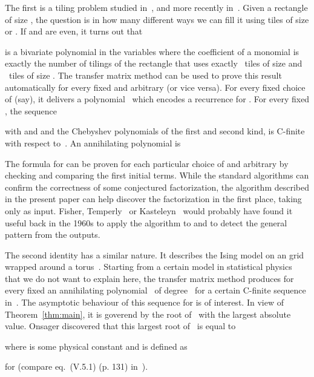 \documentclass{sig-alternate}
\begin{document}
\def\-{{\tikz[x=1.5pt,y=1.5pt]\draw[very thin](0,0) rectangle (1,1) (1,0) rectangle (2,1);}}
\def\|{{\tikz[x=1.5pt,y=1.5pt]\draw[very thin](0,0) rectangle (1,1) (0,1) rectangle (1,2);}}

The first is a tiling problem studied in~\cite{kasteleyn61,fisher61}, and more recently in~\cite{zeilberger06a}.
Given a rectangle of size , the question is
in how many different ways we can fill it using tiles of size  or .
If  and  are even, it turns out that

is a bivariate polynomial in the variables  where the coefficient of a monomial  is exactly
the number of tilings of the  rectangle that uses exactly ~tiles of size 
and ~tiles of size . 
The transfer matrix method can be used to prove this result automatically for every fixed
 and arbitrary  (or vice versa). For every fixed choice of  (say), it delivers
a polynomial~ which encodes a recurrence for . For every fixed ,
the sequence

with  and  and  the Chebyshev polynomials
of the first and second kind, 
is C-finite with respect to~. An annihilating polynomial is

The formula for  can be proven for each particular choice of  and arbitrary  by checking
 and comparing the first  initial terms.
While the standard algorithms can confirm the correctness of some conjectured
factorization, the algorithm described in the present paper can
help discover the factorization in the first place, taking only  as input.
Fisher, Temperly~\cite{fisher61} or Kasteleyn~\cite{kasteleyn61} would probably
have found it useful back in the 1960s to apply the algorithm to 
and to detect the general pattern from the outputs.

The second identity has a similar nature. It describes the Ising model on an
 grid wrapped around a torus~\cite{onsager44,thompson72}. Starting
from a certain model in statistical physics that we do not want to explain here,
the transfer matrix method produces for every fixed  an annihilating
polynomial~ of degree~ for a certain C-finite sequence in~. The
asymptotic behaviour of this sequence for  is of interest. In view
of Theorem~\ref{thm:main}, it is goverend by the root of~ with the largest
absolute value. Onsager discovered that this largest root of~ is equal to

where  is some physical constant and  is defined as
\def\arccosh{\operatorname{arccosh}}

for  (compare eq.~(V.5.1) (p. 131) in~\cite{thompson72}). 
\end{document}

